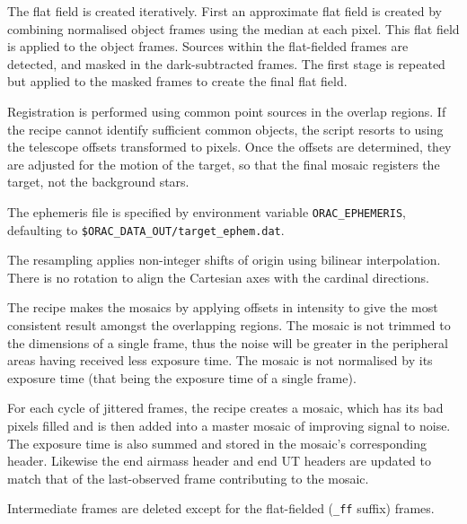 \documentclass[twoside,11pt,nolof]{starlink}
\begin{document}
{{{         \sstitem
         The flat field is created iteratively.  First an approximate
         flat field is created by combining normalised object frames using
         the median at each pixel.  This flat field is applied to the object
         frames.  Sources within the flat-fielded frames are detected, and
         masked in the dark-subtracted frames.  The first stage is repeated
         but applied to the masked frames to create the final flat field.

         \sstitem
         Registration is performed using common point sources in the
         overlap regions.  If the recipe cannot identify sufficient common
         objects, the script resorts to using the telescope offsets
         transformed to pixels.  Once the offsets are determined, they
         are adjusted for the motion of the target, so that the final
         mosaic registers the target, not the background stars.

         \sstitem
         The ephemeris file is specified by environment variable
         {\tt{ORAC\_EPHEMERIS}}, defaulting to {\tt\$ORAC\_DATA\_OUT/target\_ephem.dat}.

         \sstitem
         The resampling applies non-integer shifts of origin using
         bilinear interpolation.  There is no rotation to align the
         Cartesian axes with the cardinal directions.

         \sstitem
         The recipe makes the mosaics by applying offsets in intensity
         to give the most consistent result amongst the overlapping regions.
         The mosaic is not trimmed to the dimensions of a single frame, thus
         the noise will be greater in the peripheral areas having received
         less exposure time.  The mosaic is not normalised by its exposure
         time (that being the exposure time of a single frame).

         \sstitem
         For each cycle of jittered frames, the recipe creates a mosaic,
         which has its bad pixels filled and is then added into a master
         mosaic of improving signal to noise.  The exposure time is also
         summed and stored in the mosaic's corresponding header.
	 Likewise the end airmass header and end UT headers are
	 updated to match that of the last-observed frame contributing
	 to the mosaic.

         \sstitem
         Intermediate frames are deleted except for the flat-fielded ({\tt\_ff}
         suffix) frames.
      }
   }
   \label{mjsf_ephem_format}
   }
\end{document}
